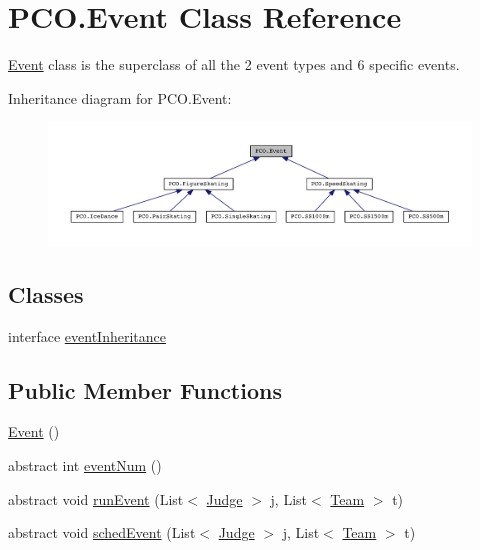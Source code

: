 \hypertarget{classPCO_1_1Event}{\section{P\+C\+O.\+Event Class Reference}
\label{classPCO_1_1Event}
}


\hyperlink{classPCO_1_1Event}{Event} class is the superclass of all the 2 event types and 6 specific events.  




Inheritance diagram for P\+C\+O.\+Event\+:\nopagebreak
\begin{figure}[H]
\begin{center}
\leavevmode
\includegraphics[width=350pt]{classPCO_1_1Event__inherit__graph}
\end{center}
\end{figure}
\subsection*{Classes}
\begin{DoxyCompactItemize}
\item 
interface \hyperlink{interfacePCO_1_1Event_1_1eventInheritance}{event\+Inheritance}
\end{DoxyCompactItemize}
\subsection*{Public Member Functions}
\begin{DoxyCompactItemize}
\item 
\hyperlink{classPCO_1_1Event_a55055f951cbfc76c9d62086b25aa93d0}{Event} ()
\item 
abstract int \hyperlink{classPCO_1_1Event_a89e26f29f5cfc92627bbb5a5e4ca1053}{event\+Num} ()
\item 
abstract void \hyperlink{classPCO_1_1Event_ad47d86904767dfebc731be328ec0958d}{run\+Event} (List$<$ \hyperlink{classPCO_1_1Judge}{Judge} $>$ j, List$<$ \hyperlink{classPCO_1_1Team}{Team} $>$ t)
\item 
abstract void \hyperlink{classPCO_1_1Event_a6a19f71e79d0f498ba74c9cd86c27eaa}{sched\+Event} (List$<$ \hyperlink{classPCO_1_1Judge}{Judge} $>$ j, List$<$ \hyperlink{classPCO_1_1Team}{Team} $>$ t)
\end{DoxyCompactItemize}


